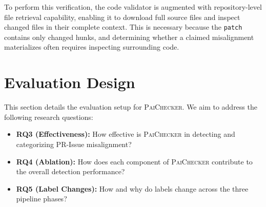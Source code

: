 \documentclass[sigconf, review, anonymous]{acmart}
\newcommand{\tool}{\textsc{PaiChecker}\xspace}
\begin{document}
  To perform this verification, the code validator is augmented with                                                                       
  repository-level file retrieval capability, enabling it to download                                                                      
  full source files and inspect changed files in their complete                                                                          
  context. This is necessary because the \texttt{patch} contains only
  changed hunks, and determining whether a claimed misalignment                                                                            
  materializes often requires inspecting surrounding code.


    \section{Evaluation Design}
    \label{sec:eval_design}

    This section details the evaluation setup for \tool. We aim to address the following research questions:
    
    \begin{itemize}[leftmargin=*]
        \item \textbf{RQ3 (Effectiveness):} How effective is \tool in detecting
            and categorizing PR-Issue misalignment?
        \item \textbf{RQ4 (Ablation):} How does each component of \tool
            contribute to the overall detection performance?
        \item \textbf{RQ5 (Label Changes):} How and why do labels change across the three pipeline phases?
    \end{itemize}
\end{document}
